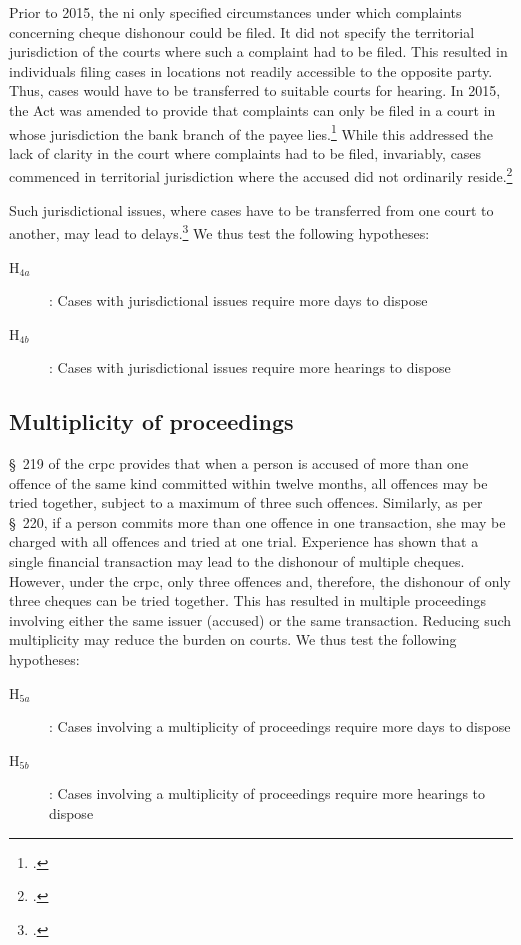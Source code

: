 \begin{enumerate}
\begin{enumerate}
Prior to 2015, the \gls{ni} only specified circumstances under which complaints concerning cheque dishonour could be filed. It did not specify the territorial jurisdiction of the courts where such a complaint had to be filed. This resulted in individuals filing cases in locations not readily accessible to the opposite party. Thus, cases would have to be transferred to suitable courts for hearing. In 2015, the Act was amended to provide that complaints can only be filed in a court in whose jurisdiction the bank branch of the payee lies.\footcite{niAmend2015} While this addressed the lack of clarity in the court where complaints had to be filed, invariably, cases commenced in territorial jurisdiction where the accused did not ordinarily reside.\footcite{amicus2020_submission}

Such jurisdictional issues, where cases have to be transferred from one court to another, may lead to delays.\footcite{sc2020_138, amicus2020_submission} We thus test the following hypotheses:

\begin{description}
\item[H$_{4a}$]: Cases with jurisdictional issues require more days to dispose
\item[H$_{4b}$]: Cases with jurisdictional issues require more hearings to dispose
\end{description}

\subsection{Multiplicity of proceedings}

\S~219 of the \gls{crpc} provides that when a person is accused of more than one offence of the same kind committed within twelve months, all offences may be tried together, subject to a maximum of three such offences. Similarly, as per \S~220, if a person commits more than one offence in one transaction, she may be charged with all offences and tried at one trial. Experience has shown that a single financial transaction may lead to the dishonour of multiple cheques. However, under the \gls{crpc}, only three offences and, therefore, the dishonour of only three cheques can be tried together. This has resulted in multiple proceedings involving either the same issuer (accused) or the same transaction. Reducing such multiplicity may reduce the burden on courts. We thus test the following hypotheses:

\begin{description}
\item[H$_{5a}$]: Cases involving a multiplicity of proceedings require more days to dispose
\item[H$_{5b}$]: Cases involving a multiplicity of proceedings require more hearings to dispose
\end{description}


\end{enumerate}
\end{enumerate}
